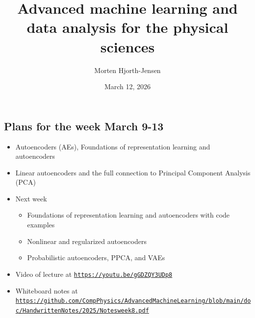 \documentclass[%
oneside,                 %
final,                   %
10pt]{article}
\begin{document}

\newcommand{\exercisesection}[1]{\subsection*{#1}}






\title{Advanced machine learning and data analysis for the physical sciences}


\author{Morten Hjorth-Jensen}

\date{March 12, 2026
}

\subsection{Plans for the week March 9-13}

\begin{block}{}
\begin{itemize}
\item Autoencoders (AEs), Foundations of representation learning and autoencoders

\item Linear autoencoders and the full connection to Principal Component Analysis (PCA)

\item Next week
\begin{itemize}

  \item Foundations of representation learning and autoencoders with code examples

  \item Nonlinear and regularized autoencoders

  \item Probabilistic autoencoders, PPCA, and VAEs

\end{itemize}

\noindent
\item Video of lecture at \href{{https://youtu.be/gGDZQY3UDp8}}{\nolinkurl{https://youtu.be/gGDZQY3UDp8}}

\item Whiteboard notes at \href{{https://github.com/CompPhysics/AdvancedMachineLearning/blob/main/doc/HandwrittenNotes/2025/Notesweek8.pdf}}{\nolinkurl{https://github.com/CompPhysics/AdvancedMachineLearning/blob/main/doc/HandwrittenNotes/2025/Notesweek8.pdf}}
\end{itemize}

\noindent
\end{block}
\end{document}
